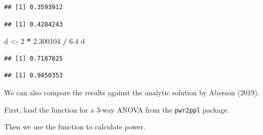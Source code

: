 \documentclass[]{book}
\newenvironment{Shaded}{\begin{snugshade}}{\end{snugshade}}
\newcommand{\DataTypeTok}[1]{\textcolor[rgb]{0.13,0.29,0.53}{#1}}
\newcommand{\DecValTok}[1]{\textcolor[rgb]{0.00,0.00,0.81}{#1}}
\newcommand{\FloatTok}[1]{\textcolor[rgb]{0.00,0.00,0.81}{#1}}
\newcommand{\KeywordTok}[1]{\textcolor[rgb]{0.13,0.29,0.53}{\textbf{#1}}}
\newcommand{\NormalTok}[1]{#1}
\newcommand{\OperatorTok}[1]{\textcolor[rgb]{0.81,0.36,0.00}{\textbf{#1}}}
\newcommand{\StringTok}[1]{\textcolor[rgb]{0.31,0.60,0.02}{#1}}
\begin{document}
\begin{verbatim}
## [1] 0.3593912
\end{verbatim}

\begin{Shaded}
\end{Shaded}

\begin{verbatim}
## [1] 0.4284243
\end{verbatim}

\begin{Shaded}
\begin{Highlighting}[]
\NormalTok{d <-}\StringTok{ }\DecValTok{2} \OperatorTok{*}\StringTok{ }\FloatTok{2.300104} \OperatorTok{/}\StringTok{ }\FloatTok{6.4}
\NormalTok{d}
\end{Highlighting}
\end{Shaded}

\begin{verbatim}
## [1] 0.7187825
\end{verbatim}

\begin{Shaded}
\end{Shaded}

\begin{verbatim}
## [1] 0.9450353
\end{verbatim}

We can also compare the results against the analytic solution by Aberson (2019).

First, load the function for a 3-way ANOVA from the \texttt{pwr2ppl} package.

Then we use the function to calculate power.
\end{document}
